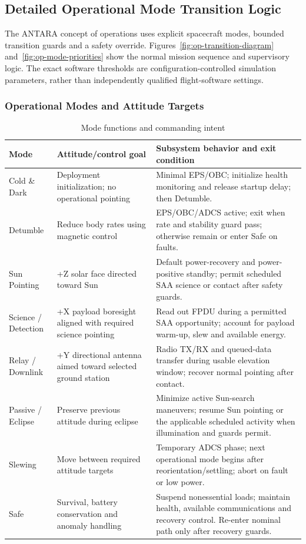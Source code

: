 \subsection{Detailed Operational Mode Transition Logic}\label{app:operational-logic}
The ANTARA concept of operations uses explicit spacecraft modes, bounded transition guards and a safety override. Figures~\ref{fig:op-transition-diagram} and~\ref{fig:op-mode-priorities} show the normal mission sequence and supervisory logic. The exact software thresholds are configuration-controlled simulation parameters, rather than independently qualified flight-software settings.

\subsubsection{Operational Modes and Attitude Targets}\label{app:op-logic-summary}
\begin{table}[htbp]\centering\footnotesize
\caption{Mode functions and commanding intent}\label{tab:op-mode-summary}
\begin{tabularx}{\linewidth}{@{}p{1.85cm}p{3.05cm}X@{}}\toprule
Mode & Attitude/control goal & Subsystem behavior and exit condition\\\midrule
Cold \& Dark & Deployment initialization; no operational pointing & Minimal EPS/OBC; initialize health monitoring and release startup delay; then Detumble.\\
Detumble & Reduce body rates using magnetic control & EPS/OBC/ADCS active; exit when rate and stability guard pass; otherwise remain or enter Safe on faults.\\
Sun Pointing & +Z solar face directed toward Sun & Default power-recovery and power-positive standby; permit scheduled SAA science or contact after safety guards.\\
Science / Detection & +X payload boresight aligned with required science pointing & Read out FPDU during a permitted SAA opportunity; account for payload warm-up, slew and available energy.\\
Relay / Downlink & +Y directional antenna aimed toward selected ground station & Radio TX/RX and queued-data transfer during usable elevation window; recover normal pointing after contact.\\
Passive / Eclipse & Preserve previous attitude during eclipse & Minimize active Sun-search maneuvers; resume Sun pointing or the applicable scheduled activity when illumination and guards permit.\\
Slewing & Move between required attitude targets & Temporary ADCS phase; next operational mode begins after reorientation/settling; abort on fault or low power.\\
Safe & Survival, battery conservation and anomaly handling & Suspend nonessential loads; maintain health, available communications and recovery control. Re-enter nominal path only after recovery guards.\\\bottomrule
\end{tabularx}\end{table}


